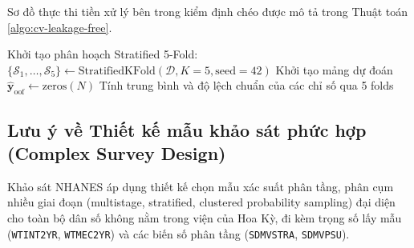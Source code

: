 Sơ đồ thực thi tiền xử lý bên trong kiểm định chéo được mô tả trong Thuật toán \ref{algo:cv-leakage-free}.

\begin{algorithm}[h!]
\SetAlgoLined
{}
Khởi tạo phân hoạch Stratified 5-Fold: $\{\mathcal{S}_1, \dots, \mathcal{S}_5\} \leftarrow \text{StratifiedKFold}(\mathcal{D}, K=5, \text{seed}=42)$\;
Khởi tạo mảng dự đoán $\hat{\mathbf{y}}_{\text{oof}} \leftarrow \text{zeros}(N)$\;
Tính trung bình và độ lệch chuẩn của các chỉ số qua 5 folds\;
\;
\caption{Quy trình kiểm định chéo Stratified 5-Fold không rò rỉ dữ liệu trong DepSev-ML}
\label{algo:cv-leakage-free}
\end{algorithm}

\subsection{Lưu ý về Thiết kế mẫu khảo sát phức hợp (Complex Survey Design)}
\label{subsec:nhanes-survey-design-note}
Khảo sát NHANES áp dụng thiết kế chọn mẫu xác suất phân tầng, phân cụm nhiều giai đoạn (multistage, stratified, clustered probability sampling) đại diện cho toàn bộ dân số không nằm trong viện của Hoa Kỳ, đi kèm trọng số lấy mẫu (\texttt{WTINT2YR}, \texttt{WTMEC2YR}) và các biến số phân tầng (\texttt{SDMVSTRA}, \texttt{SDMVPSU}). 

